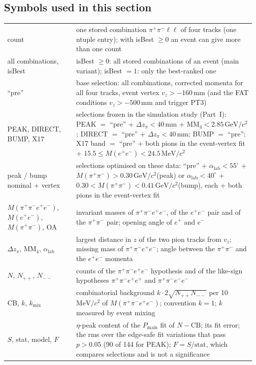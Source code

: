\documentclass[11pt,a4paper]{article}
\renewcommand{\arraystretch}{1.15}
\newcommand{\pip}{\ensuremath{\pi^{+}}\xspace}
\newcommand{\pim}{\ensuremath{\pi^{-}}\xspace}
\newcommand{\ee}{\ensuremath{e^{+}e^{-}}\xspace}
\newcommand{\pipi}{\ensuremath{\pi^{+}\pi^{-}}\xspace}
\newcommand{\ppee}{\ensuremath{\pi^{+}\pi^{-}e^{+}e^{-}}\xspace}
\newcommand{\Mfour}{\ensuremath{M(\pi^{+}\pi^{-}e^{+}e^{-})}\xspace}
\newcommand{\Mee}{\ensuremath{M(e^{+}e^{-})}\xspace}
\newcommand{\Mpipi}{\ensuremath{M(\pi^{+}\pi^{-})}\xspace}
\newcommand{\GeVcc}{\ensuremath{\mathrm{GeV}/c^{2}}\xspace}
\newcommand{\MeVcc}{\ensuremath{\mathrm{MeV}/c^{2}}\xspace}
\newcommand{\MMfour}{\ensuremath{\mathrm{MM}_4}\xspace}
\newcommand{\dzpi}{\ensuremath{\Delta z_\pi}\xspace}
\newcommand{\alab}{\ensuremath{\alpha_{\mathrm{lab}}}\xspace}
\newcommand{\Pmain}{\ensuremath{P_{\mathrm{main}}}\xspace}
\newcommand{\vz}{\ensuremath{v_z}\xspace}
\begin{document}
\subsection{Symbols used in this section}
\label{sec:symbols}
{\footnotesize
\setlength{\tabcolsep}{4pt}
\renewcommand{\arraystretch}{1.06}
\begin{longtable}{@{}>{\raggedright\arraybackslash}p{3.3cm} >{\raggedright\arraybackslash}p{\dimexpr\textwidth-3.3cm-2\tabcolsep\relax}@{}}
\toprule
count & one stored combination \pip\pim$\ell\ell$ of four tracks (one ntuple entry); with isBest $\ge0$ an event can give more than one count \\
all combinations, isBest & isBest $\ge0$: all stored combinations of an event (main variant); isBest $=1$: only the best-ranked one \\
``pre'' & base selection: all combinations, corrected momenta for all four tracks, event vertex $\vz>-160$\,mm (and the FAT conditions $\vz>-500$\,mm and trigger PT3) \\
PEAK, DIRECT, BUMP, X17 & selections frozen in the simulation study (Part~I): PEAK $=$ ``pre'' + $\dzpi<40$\,mm + $\MMfour<2.85$\,\GeVcc; DIRECT $=$ ``pre'' + $\dzpi<40$\,mm; BUMP $=$ ``pre''; X17 band $=$ ``pre'' + both pions in the event-vertex fit + $15.5\le\Mee<24.5$\,\MeVcc \\
peak / bump nominal + vertex & selections optimised on these data: ``pre'' + $\alab<55^\circ$ + $\Mpipi>0.30$\,\GeVcc (peak) or $\alab<40^\circ$ + $0.30<\Mpipi<0.41$\,\GeVcc (bump), each + both pions in the event-vertex fit \\
\Mfour, \Mee, \Mpipi, OA & invariant masses of \ppee, of the \ee pair and of the \pipi pair; opening angle of $e^+$ and $e^-$ \\
\dzpi, \MMfour, \alab & largest distance in $z$ of the two pion tracks from \vz; missing mass of \ppee; angle between the \pipi and the \ee momenta \\
$N$, $N_{++}$, $N_{--}$ & counts of the \ppee hypothesis and of the like-sign hypotheses \pipi$e^+e^+$ and \pipi$e^-e^-$ \\
CB, $k$, $k_{\mathrm{mix}}$ & combinatorial background $k\cdot2\sqrt{N_{++}N_{--}}$ per 10\,\MeVcc of \Mfour; convention $k=1$; $k$ measured by event mixing \\
$S$, stat, model, $F$ & $\eta$-peak content of the \Pmain fit of $N-\mathrm{CB}$; its fit error; the rms over the edge-safe fit variations that pass $p>0.05$ (90 of 144 for PEAK); $F=S/\mathrm{stat}$, which compares selections and is not a significance \\

\end{longtable}}
\end{document}
